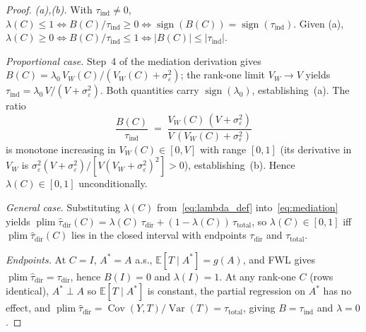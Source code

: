 \begin{proof}
\emph{(a),(b).} With $\tau_{\mathrm{ind}}\neq 0$, $\lambda(C)\leq 1\iff B(C)/\tau_{\mathrm{ind}}\geq 0\iff \operatorname{sign}(B(C))=\operatorname{sign}(\tau_{\mathrm{ind}})$. Given (a), $\lambda(C)\geq 0\iff B(C)/\tau_{\mathrm{ind}}\leq 1\iff|B(C)|\leq|\tau_{\mathrm{ind}}|$.

\emph{Proportional case.} Step~4 of the mediation derivation gives $B(C)=\lambda_0\,V_W(C)/(V_W(C)+\sigma_\varepsilon^2)$; the rank-one limit $V_W{\to}V$ yields $\tau_{\mathrm{ind}}=\lambda_0\,V/(V+\sigma_\varepsilon^2)$. Both quantities carry $\operatorname{sign}(\lambda_0)$, establishing~(a). The ratio
\[
  \frac{B(C)}{\tau_{\mathrm{ind}}}\;=\;\frac{V_W(C)\,(V+\sigma_\varepsilon^2)}{V\,(V_W(C)+\sigma_\varepsilon^2)}
\]
is monotone increasing in $V_W(C)\in[0,V]$ with range $[0,1]$ (its derivative in $V_W$ is $\sigma_\varepsilon^2(V+\sigma_\varepsilon^2)/[V(V_W+\sigma_\varepsilon^2)^2]>0$), establishing~(b). Hence $\lambda(C)\in[0,1]$ unconditionally.

\emph{General case.} Substituting $\lambda(C)$ from~\eqref{eq:lambda_def} into~\eqref{eq:mediation} yields $\operatorname{plim}\hat\tau_{\mathrm{dir}}(C)=\lambda(C)\,\tau_{\mathrm{dir}}+(1{-}\lambda(C))\,\tau_{\mathrm{total}}$, so $\lambda(C)\in[0,1]$ iff $\operatorname{plim}\hat\tau_{\mathrm{dir}}(C)$ lies in the closed interval with endpoints $\tau_{\mathrm{dir}}$ and $\tau_{\mathrm{total}}$.

\emph{Endpoints.} At $C{=}I$, $A^*{=}A$ a.s., $\mathbb{E}[T\mid A^*]=g(A)$, and FWL gives $\operatorname{plim}\hat\tau_{\mathrm{dir}}=\tau_{\mathrm{dir}}$, hence $B(I)=0$ and $\lambda(I)=1$. At any rank-one $C$ (rows identical), $A^*\perp A$ so $\mathbb{E}[T\mid A^*]$ is constant, the partial regression on $A^*$ has no effect, and $\operatorname{plim}\hat\tau_{\mathrm{dir}}=\operatorname{Cov}(Y,T)/\operatorname{Var}(T)=\tau_{\mathrm{total}}$, giving $B=\tau_{\mathrm{ind}}$ and $\lambda=0$.
\end{proof}

